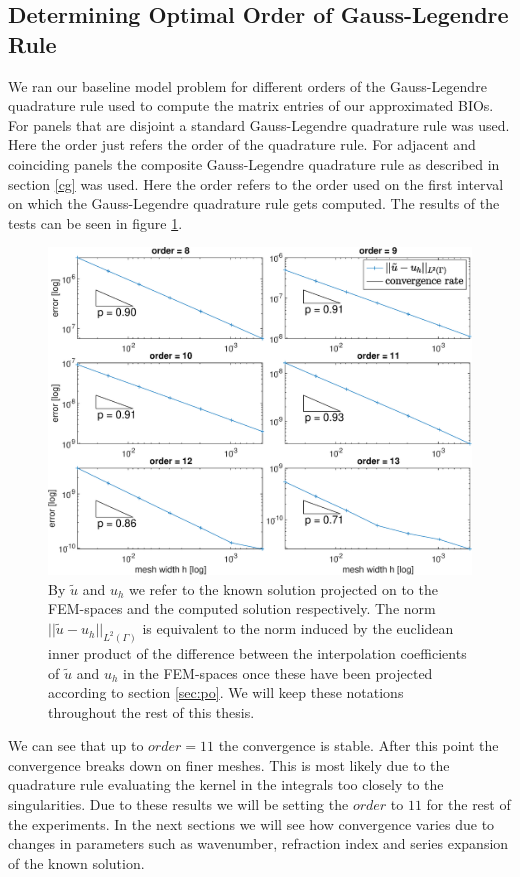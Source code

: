 \documentclass[a4paper, oneside]{discothesis}
\begin{document}
\subsection{Determining Optimal Order of Gauss-Legendre Rule}
We ran our baseline model problem for different orders of the Gauss-Legendre quadrature rule used to compute the matrix entries of our approximated BIOs.
For panels that are disjoint a standard Gauss-Legendre quadrature rule was used.
Here the order just refers the order of the quadrature rule.
For adjacent and coinciding panels the composite Gauss-Legendre quadrature rule as described in section \ref{cg} was used.
Here the order refers to the order used on the first interval on which the Gauss-Legendre quadrature rule gets computed. 
The results of the tests can be seen in figure \ref{fig:order}.
\begin{figure} [!ht]
	\centering
	\includegraphics[width=\columnwidth]{figures/order.eps}
	\caption{ By $\tilde{u}$ and $u_h$ we refer to the known solution projected on to the FEM-spaces and the computed solution respectively.
		The norm $||\tilde{u}-u_h||_{L^2(\Gamma)}$ is equivalent to the norm induced by the euclidean inner product of the difference between the interpolation coefficients of $\tilde{u}$ and $u_h$ in the FEM-spaces once these have been projected according to section \ref{sec:po}.
		We will keep these notations throughout the rest of this thesis.
	}
	\label{fig:order}
\end{figure}
We can see that up to $order=11$ the convergence is stable. 
After this point the convergence breaks down on finer meshes.
This is most likely due to the quadrature rule evaluating the kernel in the integrals too closely to the singularities.
Due to these results we will be setting the $order$ to $11$ for the rest of the experiments.
In the next sections we will see how convergence varies due to changes in parameters such as wavenumber, refraction index and series expansion of the known solution.
\end{document}

